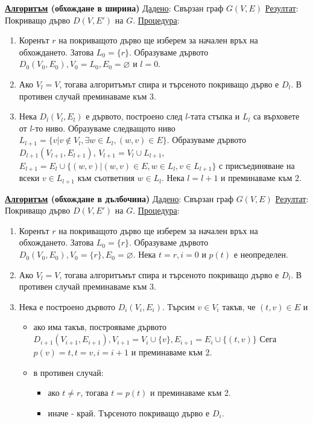 \documentclass{article}
\begin{document}
\textbf{\underline{Алгоритъм} (обхождане в ширина)} \newline\newline
\underline{Дадено}: Свързан граф $G(V, E)$ \newline
\underline{Резултат}: Покриващо дърво $D(V, E')$ на $G$. \newline
\underline{Процедура}:
\begin{enumerate}
    \item Коренът $r$ на покриващото дърво ще изберем за начален връх на обхождането. Затова $L_0 = \{r\}$. Образуваме дървото
    $D_0(V_0, E_0), V_0 = L_0, E_0 = \varnothing$ и $l = 0$.
    \item Ако $V_l = V$, тогава алгоритъмът спира и търсеното покриващо дърво е $D_l$. В противен случай преминаваме към $3$.
    \item Нека $D_l(V_l, E_l)$ е дървото, построено след $l$-тата стъпка и $L_l$ са върховете от $l$-то ниво. Образуваме
    следващото ниво $L_{l+1} = \{v | v \notin V_l, \exists w \in L_l, (w, v) \in E\}$. Образуваме дървото $D_{l+1}(V_{l+1}, E_{l+1})$,
    $V_{l+1} = V_l \cup L_{l+1}$, $E_{l+1} = E_l \cup \{(w, v) | (w, v) \in E, w \in L_l, v \in L_{l+1}\}$ с присъединяване на
    всеки $v \in L_{l+1}$ към съответния $w \in L_l$. Нека $l = l + 1$ и преминаваме към $2$.
\end{enumerate}
\textbf{\underline{Алгоритъм} (обхождане в дълбочина)} \newline\newline
\underline{Дадено}: Свързан граф $G(V, E)$ \newline
\underline{Резултат}: Покриващо дърво $D(V, E')$ на $G$. \newline
\underline{Процедура}:
\begin{enumerate}
    \item Коренът $r$ на покриващото дърво ще изберем за начален връх на обхождането. Затова $L_0 = \{r\}$. Образуваме дървото
    $D_0(V_0, E_0), V_0 = \{r\}, E_0 = \varnothing$. Нека $t = r, i = 0$ и $p(t)$ е неопределен.
    \item Ако $V_l = V$, тогава алгоритъмът спира и търсеното покриващо дърво е $D_l$. В противен случай преминаваме към $3$.
    \item Нека е построено дървото $D_i(V_i, E_i)$. Търсим $v \in V_i$ такъв, че $(t, v) \in E$ и
    \begin{itemize}
        \item ако има такъв, построяваме дървото $D_{i+1}(V_{i+1}, E_{i+1}), V_{i+1} = V_i \cup \{v\}, E_{i+1} = E_i \cup \{(t, v)\}$
        Сега $p(v) = t, t = v, i = i + 1$ и преминаваме към 2.
        \item в противен случай:
        \begin{itemize}
            \item ако $t \neq r$, тогава $t = p(t)$ и преминаваме към 2.
            \item иначе - край. Търсеното покриващо дърво е $D_i$.
        \end{itemize}
    \end{itemize}
\end{enumerate}
\end{document}
